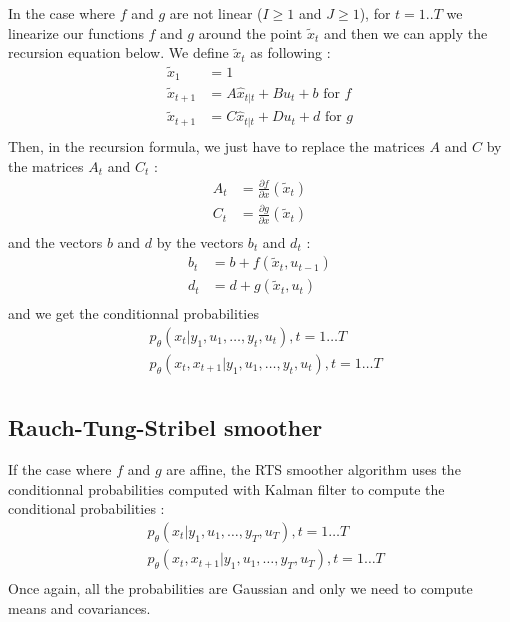 In the case where $f$ and $g$ are not linear ($I \geq 1$ and $J \geq 1$), for $t=1..T$ we linearize our functions $f$ and $g$ around the point $\tilde{x}_t$ and then we can apply the recursion equation below.
We define $\tilde{x}_t$ as following :
\begin{align*}
  \tilde{x}_1 &= 1\\
  \tilde{x}_{t+1} &= A\hat{x}_{t|t} + B u_t + b \text{ for $f$}\\
  \tilde{x}_{t+1} &= C\hat{x}_{t|t} + D u_t + d \text{ for $g$}\\
\end{align*}
Then, in the recursion formula, we just have to replace the matrices $A$ and $C$  by the matrices $A_t$ and $C_t$ :
\begin{align*}
  A_t &= \frac{\partial f}{\partial x}(\tilde{x}_t)\\
  C_t &= \frac{\partial g}{\partial x}(\tilde{x}_t)\\
\end{align*}
and the vectors $b$ and $d$ by the vectors $b_t$ and $d_t$ :
\begin{align*}
  b_t &= b + f(\tilde{x}_t, u_{t-1})\\
  d_t &= d + g(\tilde{x}_t, u_t)\\
\end{align*}
and we get the conditionnal probabilities
\begin{align*}
  &p_{\theta}\left(x_t|y_1, u_1, \ldots, y_t, u_t \right ), t=1 \ldots T\\
  &p_{\theta}\left(x_t, x_{t+1}|y_1, u_1, \ldots, y_t, u_t \right ), t=1 \ldots T\\
\end{align*}

\subsection{Rauch-Tung-Stribel smoother}

If the case where $f$ and $g$ are affine, the RTS smoother algorithm uses the conditionnal probabilities computed with Kalman filter to compute the conditional probabilities :
\begin{align*}
  &p_{\theta}\left(x_t|y_1, u_1, \ldots, y_T, u_T \right ), t=1 \ldots T\\
  &p_{\theta}\left(x_t, x_{t+1}|y_1, u_1, \ldots, y_T, u_T \right ), t=1 \ldots T\\
\end{align*}
Once again, all the probabilities are Gaussian and only we need to compute means and covariances.

